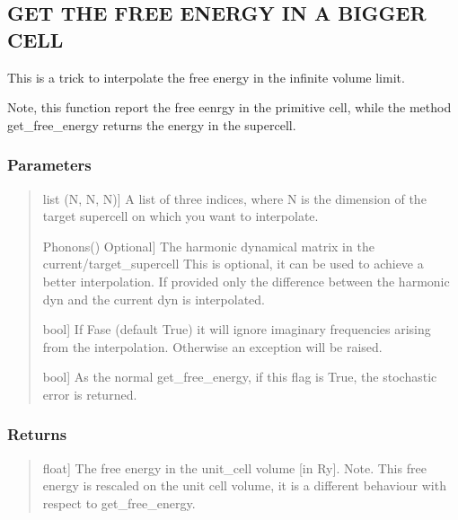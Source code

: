 \documentclass[a4paper,11pt,english]{sphinxmanual}
\begin{document}
\begin{fulllineitems}
\begin{fulllineitems}
\subsection{GET THE FREE ENERGY IN A BIGGER CELL}
\label{\detokenize{apireference:get-the-free-energy-in-a-bigger-cell}}
\sphinxAtStartPar
This is a trick to interpolate the free energy in the
infinite volume limit.

\sphinxAtStartPar
Note, this function report the free eenrgy in the primitive cell, while the method get\_free\_energy
returns the energy in the supercell.


\subsubsection{Parameters}
\label{\detokenize{apireference:id10}}\begin{quote}
\begin{description}
\sphinxlineitem{target\_supercell}{[}list (N, N, N){]}
\sphinxAtStartPar
A list of three indices, where N is the dimension
of the target supercell on which you want to interpolate.

\sphinxlineitem{support\_dyn{[}coarse/fine{]}}{[}Phonons() Optional{]}
\sphinxAtStartPar
The harmonic dynamical matrix in the current/target\_supercell
This is optional, it can be used to achieve a better
interpolation. If provided only the difference between
the harmonic dyn and the current dyn is interpolated.

\sphinxlineitem{error\_on\_imaginary\_frequency}{[}bool{]}
\sphinxAtStartPar
If Fase (default True) it will ignore imaginary frequencies
arising from the interpolation. Otherwise an exception will
be raised.

\sphinxlineitem{return\_error}{[}bool{]}
\sphinxAtStartPar
As the normal get\_free\_energy, if this flag is True, the stochastic error is returned.

\end{description}
\end{quote}


\subsubsection{Returns}
\label{\detokenize{apireference:id11}}\begin{quote}
\begin{description}
\sphinxlineitem{free\_energy}{[}float{]}
\sphinxAtStartPar
The free energy in the unit\_cell volume {[}in Ry{]}. Note.
This free energy is rescaled on the unit cell volume,
it is a different behaviour with respect to get\_free\_energy.


\end{description}
\end{quote}
\end{fulllineitems}
\end{fulllineitems}
\end{document}
